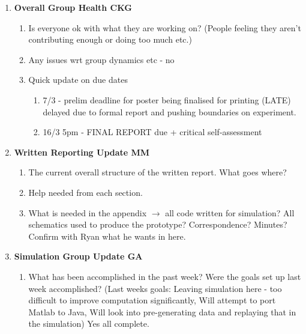 \begin{enumerate}
\item  \textbf{Overall Group Health CKG}

\begin{enumerate}
\item Is everyone ok with what they are working on? (People feeling they aren't contributing enough or doing too much etc.)

\item  Any issues wrt group dynamics etc - no

\item  Quick update on due dates

\begin{enumerate}
\item  7/3 - prelim deadline for poster being finalised for printing (LATE) delayed due to formal report and pushing boundaries on experiment. 

\item  16/3 5pm - FINAL REPORT due + critical self-assessment
\end{enumerate}

\end{enumerate}

\item  \textbf{Written Reporting Update MM}

\begin{enumerate}
\item The current overall structure of the written report. What goes where?

\item  Help needed from each section. 

\item  What is needed in the appendix $\mathrm{\to}$ all code written for simulation? All schematics used to produce the prototype? Correspondence? Minutes? Confirm with Ryan what he wants in here.

\end{enumerate}

\item  \textbf{Simulation Group Update GA}

\begin{enumerate}
\item What has been accomplished in the past week? Were the goals set up last week accomplished? (Last weeks goals: Leaving simulation here - too difficult to improve computation significantly, Will attempt to port Matlab to Java, Will look into pre-generating data and replaying that in the simulation) Yes all complete.


\end{enumerate}
\end{enumerate}

